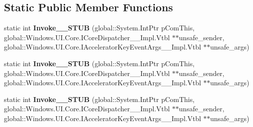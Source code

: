 \subsection*{Static Public Member Functions}
\begin{DoxyCompactItemize}
\item 
\mbox{\label{struct_windows_1_1_foundation_1_1_typed_event_handler___a___windows___u_i___core___core_dispatch3f137e4e492cef082f78b8aa53fc2fe8_ad90c048c000049f02ad4245d52448f0d}} 
static int {\bfseries Invoke\+\_\+\+\_\+\+S\+T\+UB} (global\+::\+System.\+Int\+Ptr p\+Com\+This, global\+::\+Windows.\+U\+I.\+Core.\+I\+Core\+Dispatcher\+\_\+\+\_\+\+Impl.\+Vtbl $\ast$$\ast$unsafe\+\_\+sender, global\+::\+Windows.\+U\+I.\+Core.\+I\+Accelerator\+Key\+Event\+Args\+\_\+\+\_\+\+Impl.\+Vtbl $\ast$$\ast$unsafe\+\_\+args)
\item 
\mbox{\label{struct_windows_1_1_foundation_1_1_typed_event_handler___a___windows___u_i___core___core_dispatch3f137e4e492cef082f78b8aa53fc2fe8_ad90c048c000049f02ad4245d52448f0d}} 
static int {\bfseries Invoke\+\_\+\+\_\+\+S\+T\+UB} (global\+::\+System.\+Int\+Ptr p\+Com\+This, global\+::\+Windows.\+U\+I.\+Core.\+I\+Core\+Dispatcher\+\_\+\+\_\+\+Impl.\+Vtbl $\ast$$\ast$unsafe\+\_\+sender, global\+::\+Windows.\+U\+I.\+Core.\+I\+Accelerator\+Key\+Event\+Args\+\_\+\+\_\+\+Impl.\+Vtbl $\ast$$\ast$unsafe\+\_\+args)
\item 
\mbox{\label{struct_windows_1_1_foundation_1_1_typed_event_handler___a___windows___u_i___core___core_dispatch3f137e4e492cef082f78b8aa53fc2fe8_ad90c048c000049f02ad4245d52448f0d}} 
static int {\bfseries Invoke\+\_\+\+\_\+\+S\+T\+UB} (global\+::\+System.\+Int\+Ptr p\+Com\+This, global\+::\+Windows.\+U\+I.\+Core.\+I\+Core\+Dispatcher\+\_\+\+\_\+\+Impl.\+Vtbl $\ast$$\ast$unsafe\+\_\+sender, global\+::\+Windows.\+U\+I.\+Core.\+I\+Accelerator\+Key\+Event\+Args\+\_\+\+\_\+\+Impl.\+Vtbl $\ast$$\ast$unsafe\+\_\+args)
\item 
\mbox{\label{struct_windows_1_1_foundation_1_1_typed_event_handler___a___windows___u_i___core___core_dispatch3f137e4e492cef082f78b8aa53fc2fe8_ad90c048c000049f02ad4245d52448f0d}} 

\end{DoxyCompactItemize}
